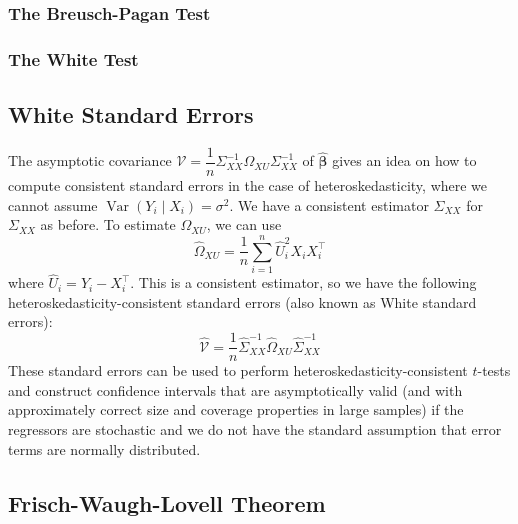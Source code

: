 \documentclass[11pt]{report} %
\begin{document}
\subsubsection{The Breusch-Pagan Test}

\subsubsection{The White Test}

\subsection{White Standard Errors}

The asymptotic covariance $\mathcal{V} = \dfrac{1}{n}\Sigma_{XX}^{-1}\Omega_{XU}\Sigma_{XX}^{-1}$ of $\widehat{\boldsymbol{\beta}}$ gives an idea on how to compute consistent standard errors in the case of heteroskedasticity, where we cannot assume $\operatorname{Var}\left(Y_{i}\middle| X_{i}\right) = \sigma^{2}$. We have a consistent estimator $\widehat{\Sigma}_{XX}$ for $\Sigma_{XX}$ as before. To estimate $\Omega_{XU}$, we can use
\begin{equation}
\widehat{\Omega}_{XU} = \dfrac{1}{n}\sum_{i = 1}^{n}\widehat{U}_{i}^{2}X_{i}X_{i}^{\top}
\end{equation}
where $\widehat{U}_{i} = Y_{i} - X_{i}^{\top}$. This is a consistent estimator, so we have the following heteroskedasticity-consistent standard errors (also known as White standard errors):
\begin{equation}
\widehat{\mathcal{V}} = \dfrac{1}{n}\widehat{\Sigma}_{XX}^{-1}\widehat{\Omega}_{XU}\widehat{\Sigma}_{XX}^{-1}
\end{equation}
These standard errors can be used to perform heteroskedasticity-consistent $t$-tests and construct confidence intervals that are asymptotically valid (and with approximately correct size and coverage properties in large samples) if the regressors are stochastic and we do not have the standard assumption that error terms are normally distributed.

\subsection{Frisch-Waugh-Lovell Theorem \cite{Greene2012}}
\end{document}
